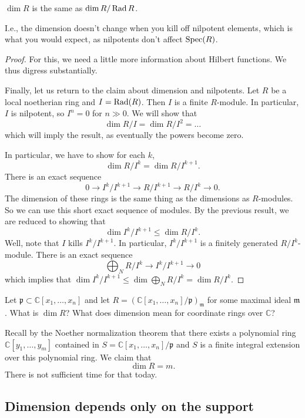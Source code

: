 \begin{proposition} 
$\dim R$ is the same as $\dim R/\operatorname{Rad} R$.
\end{proposition} 
I.e., the dimension doesn't change when you kill off nilpotent elements, which
is what you would expect, as nilpotents don't affect $\operatorname{Spec} (R)$.
\begin{proof} 
For this, we need a little more information about Hilbert functions.
We thus digress substantially. 


Finally, let us return to the claim about dimension and nilpotents. Let $R$ be
a local noetherian ring and $I = \operatorname{Rad} (R)$. Then $I$ is a finite $R$-module. In
particular, $I$ is nilpotent, so $I^n  = 0$ for $n \gg 0$. We will show that
\[ \dim R/I = \dim R/I^2 = \dots \]
which will imply the result, as eventually the powers become zero. 

In particular, we have to show for each $k$, 
\[ \dim R/I^k  = \dim R/I^{k+1}.  \]
There is an exact sequence
\[ 0 \to I^k/I^{k+1} \to R/I^{k+1} \to R/I^k \to 0.  \]
The dimension of these rings is the same thing as the dimensions as
$R$-modules. So we can use this short exact sequence of modules. By the
previous result, we are reduced to showing that
\[ \dim I^k/I^{k+1} \leq \dim R/I^k.  \]
Well, note that $I$ kills $I^k/I^{k+1}$. In particular, $I^k/I^{k+1}$ is a finitely generated
$R/I^k$-module. There is an exact sequence
\[ \bigoplus_N R/I^k \to I^k/I^{k+1} \to 0  \]
which implies that $\dim I^k/I^{k+1} \leq \dim \bigoplus_N R/I^k = \dim R/I^k$.
\end{proof} 

\begin{example} 
Let $\mathfrak{p} \subset \mathbb{C}[x_1, \dots, x_n]$ and let $R =
(\mathbb{C}[x_1,\dots, x_n]/\mathfrak{p})_{\mathfrak{m}}$ for some maximal
ideal $\mathfrak{m}$. What is $\dim R$? 
What does dimension mean for coordinate rings over $\mathbb{C}$?

Recall by the Noether normalization theorem that there exists a polynomial ring
$\mathbb{C}[y_1, \dots, y_m]$ contained in $S=\mathbb{C}[x_1,\dots,
x_n]/\mathfrak{p}$ and $S$ is a finite integral extension over this polynomial ring. 
We claim that 
\[ \dim R = m.  \]
There is not sufficient time for that today. 
\end{example} 

\subsection{Dimension depends only on the support}

